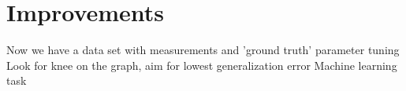 \section{Improvements}
Now we have a data set with measurements and 'ground truth'
parameter tuning
Look for knee on the graph, aim for lowest generalization error
Machine learning task
